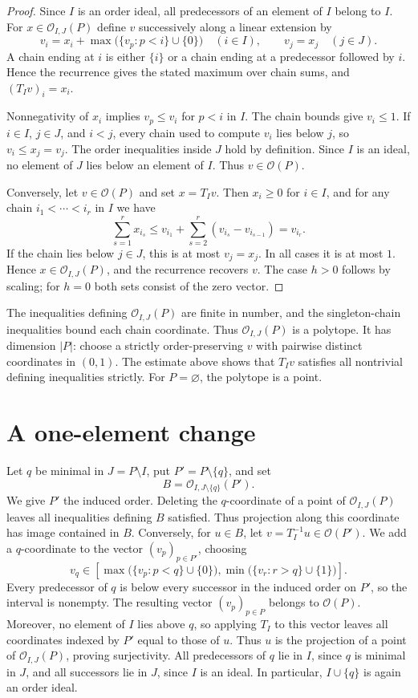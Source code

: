 \documentclass[a4paper,12pt]{amsart}
\theoremstyle{definition}
\theoremstyle{remark}
\newcommand{\OO}{\mathcal O}
\begin{document}
\begin{proof}
Since $I$ is an order ideal, all predecessors of an element of $I$ belong to $I$.  
For $x\in\OO_{I,J}(P)$ define $v$ successively along a linear extension by
\[
 v_i=x_i+\max\bigl(\{v_p:p<i\}\cup\{0\}\bigr)\quad(i\in I),  \qquad v_j=x_j\quad(j\in J).
\]
A chain ending at $i$ is either $\{i\}$ or a chain ending at a predecessor followed by $i$.  
Hence the recurrence gives the stated maximum over chain sums, and $(T_Iv)_i=x_i$.

Nonnegativity of $x_i$ implies $v_p\leq v_i$ for $p<i$ in $I$.
The chain bounds give $v_i\leq1$.  
If $i\in I$, $j\in J$, and $i<j$, every chain used to compute $v_i$ lies below $j$, so $v_i\leq x_j=v_j$.
The order inequalities inside $J$ hold by definition.  
Since $I$ is an ideal, no element of $J$ lies below an element of $I$.  
Thus $v\in\OO(P)$.

Conversely, let $v\in\OO(P)$ and set $x=T_Iv$.  
Then $x_i\geq0$ for $i\in I$, and for any chain $i_1<\cdots<i_r$ in $I$ we have
\[
 \sum_{s=1}^r x_{i_s}  \leq v_{i_1}+\sum_{s=2}^r(v_{i_s}-v_{i_{s-1}})  =v_{i_r}.
\]
If the chain lies below $j\in J$, this is at most $v_j=x_j$.
In all cases it is at most $1$.  
Hence $x\in\OO_{I,J}(P)$, and the recurrence recovers $v$.  
The case $h>0$ follows by scaling; for $h=0$ both sets consist of the zero vector.
\end{proof}

The inequalities defining $\OO_{I,J}(P)$ are finite in number, and the singleton-chain inequalities bound each chain coordinate.
Thus $\OO_{I,J}(P)$ is a polytope.  
It has dimension $|P|$: choose a strictly order-preserving $v$ with pairwise distinct coordinates in $(0,1)$.
The estimate above shows that $T_Iv$ satisfies all nontrivial defining inequalities strictly.  
For $P=\varnothing$, the polytope is a point.

\section{A one-element change}\label{sec:fiber}

Let $q$ be minimal in $J=P\setminus I$, put $P'=P\setminus\{q\}$, and set
\[
 B=\OO_{I,J\setminus\{q\}}(P').
\]
We give $P'$ the induced order. 
Deleting the $q$-coordinate of a point of $\OO_{I,J}(P)$ leaves all inequalities defining $B$ satisfied. 
Thus projection along this coordinate has image contained in $B$. 
Conversely, for $u\in B$, let $v=T_I^{-1}u\in\OO(P')$. 
We add a $q$-coordinate to the vector $(v_p)_{p\in P'}$, choosing
\[
 v_q\in\left[   \max\bigl(\{v_p:p<q\}\cup\{0\}\bigr),   \min\bigl(\{v_r:r>q\}\cup\{1\}\bigr)\right].
\]
Every predecessor of $q$ is below every successor in the induced order on $P'$, so the interval is nonempty. 
The resulting vector $(v_p)_{p\in P}$ belongs to $\OO(P)$. 
Moreover, no element of $I$ lies above $q$, so applying $T_I$ to this vector leaves all coordinates indexed by $P'$ equal to those of $u$. 
Thus $u$ is the projection of a point of $\OO_{I,J}(P)$, proving surjectivity. 
All predecessors of $q$ lie in $I$, since
$q$ is minimal in $J$, and all successors lie in $J$, since $I$ is an ideal.
In particular, $I\cup\{q\}$ is again an order ideal.
\end{document}

